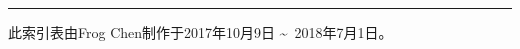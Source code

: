\documentclass{article}
\begin{document}
	\pagestyle{empty}
	\flushbottom
	
	\vfill
	\rule{1in}{0.4pt}\par
	{
		\scriptsize
		此索引表由Frog Chen制作于2017年10月9日 \textasciitilde\ 2018年7月1日。
		\par
	}
\end{document}
